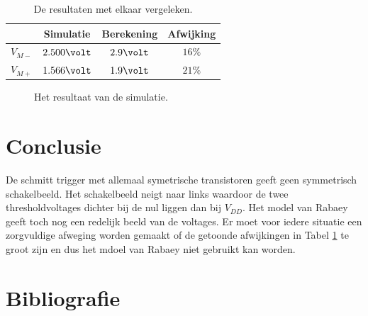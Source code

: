 \documentclass{scrartcl}  %
\begin{document}
\begin{table}[H]
\centering
\caption{De resultaten met elkaar vergeleken.}
\label{tab:trig-results}
\begin{tabular}{c c c c}
\hline\hline
 & Simulatie & Berekening & Afwijking \\
 \hline
$V_{M-}$ & $2.500\volt$ & $2.9\volt$ & $16\%$ \\
$V_{M+}$ & $1.566\volt$ & $1.9\volt$ & $21\%$ \\
  \hline
\end{tabular}
\end{table}
\begin{figure}[H]
\centering
	\setlength{} 
	\setlength{}
	
	\caption{Het resultaat van de simulatie.}
	\label{fig:st}
\end{figure}
\section{Conclusie}
\label{sec:trig-conclusie}
De schmitt trigger met allemaal symetrische transistoren geeft geen symmetrisch schakelbeeld.
Het schakelbeeld neigt naar links waardoor de twee thresholdvoltages dichter bij de nul liggen dan bij $V_{DD}$.
Het model van Rabaey geeft toch nog een redelijk beeld van de voltages.
Er moet voor iedere situatie een zorgvuldige afweging worden gemaakt of de getoonde afwijkingen in Tabel \ref{tab:trig-results} te groot zijn en dus het mdoel van Rabaey niet gebruikt kan worden.
\newpage
{}
\section{Bibliografie}
\printbibliography
\end{document}
